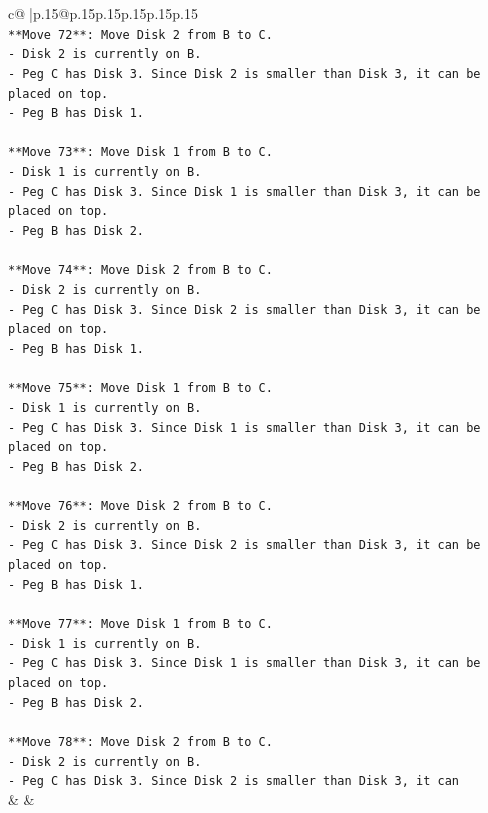 \documentclass{article}
\begin{document}
{\begin{supertabular}{c@{$\;$}|p{.15\linewidth}@{}p{.15\linewidth}p{.15\linewidth}p{.15\linewidth}p{.15\linewidth}p{.15\linewidth}}
{{{\\ 
\texttt{**Move 72**: Move Disk 2 from B to C.} \\
\texttt{{-} Disk 2 is currently on B.} \\
\texttt{{-} Peg C has Disk 3. Since Disk 2 is smaller than Disk 3, it can be placed on top.} \\
\texttt{{-} Peg B has Disk 1.} \\
\\ 
\texttt{**Move 73**: Move Disk 1 from B to C.} \\
\texttt{{-} Disk 1 is currently on B.} \\
\texttt{{-} Peg C has Disk 3. Since Disk 1 is smaller than Disk 3, it can be placed on top.} \\
\texttt{{-} Peg B has Disk 2.} \\
\\ 
\texttt{**Move 74**: Move Disk 2 from B to C.} \\
\texttt{{-} Disk 2 is currently on B.} \\
\texttt{{-} Peg C has Disk 3. Since Disk 2 is smaller than Disk 3, it can be placed on top.} \\
\texttt{{-} Peg B has Disk 1.} \\
\\ 
\texttt{**Move 75**: Move Disk 1 from B to C.} \\
\texttt{{-} Disk 1 is currently on B.} \\
\texttt{{-} Peg C has Disk 3. Since Disk 1 is smaller than Disk 3, it can be placed on top.} \\
\texttt{{-} Peg B has Disk 2.} \\
\\ 
\texttt{**Move 76**: Move Disk 2 from B to C.} \\
\texttt{{-} Disk 2 is currently on B.} \\
\texttt{{-} Peg C has Disk 3. Since Disk 2 is smaller than Disk 3, it can be placed on top.} \\
\texttt{{-} Peg B has Disk 1.} \\
\\ 
\texttt{**Move 77**: Move Disk 1 from B to C.} \\
\texttt{{-} Disk 1 is currently on B.} \\
\texttt{{-} Peg C has Disk 3. Since Disk 1 is smaller than Disk 3, it can be placed on top.} \\
\texttt{{-} Peg B has Disk 2.} \\
\\ 
\texttt{**Move 78**: Move Disk 2 from B to C.} \\
\texttt{{-} Disk 2 is currently on B.} \\
\texttt{{-} Peg C has Disk 3. Since Disk 2 is smaller than Disk 3, it can} \\
            }
        }
    }
    & & \\ \\


\end{supertabular}}
\end{document}
